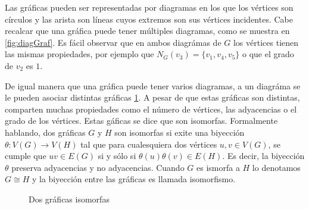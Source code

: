 Las gr\'aficas pueden ser representadas por diagramas en los que los v\'ertices
son c\'irculos y las arista son l\'ineas cuyos extremos son sus v\'ertices
incidentes. Cabe recalcar que una gr\'afica puede tener  m\'ultiples diagramas,
como se muestra en \cref{fig:diagGraf}. Es f\'acil observar que en ambos
diagr\'amas de $G$ los v\'ertices tienen las mismas propiedades, por ejemplo que
$N_G(v_3)=\{v_1,v_4,v_5\}$ o que el grado de $v_2$ es $1$.


De igual manera que una gr\'afica puede tener varios diagramas, a un diagr\'ama
se le pueden asociar distintas gr\'aficas \cref{fig:isoGraf}. A pesar de que
estas gr\'aficas son distintas, comparten muchas propiedades como el n\'umero de
v\'ertices, las adyacencias o el grado de los v\'ertices. Estas g\'aficas se
dice que son isomorfas. Formalmente hablando, dos gr\'aficas $G$ y $H$ son
isomorfas si exite una biyecci\'on $\theta: V(G) \rightarrow V(H)$ tal que para
cualesquiera dos v\'ertices $u, v \in V(G)$, se cumple que $uv \in E(G)$ si y
s\'olo si $\theta(u)\theta(v) \in E(H)$. Es decir, la biyecci\'on $\theta$
preserva adyacencias y no adyacencias. Cuando $G$ es ismorfa a $H$ lo denotamos
$G \cong H$ y la biyecci\'on entre las gr\'aficas es llamada isomorfismo.

\begin{figure}[ht!]
    \centering
    \caption{Dos gr\'aficas isomorfas}
    \label{fig:isoGraf}
\end{figure}

